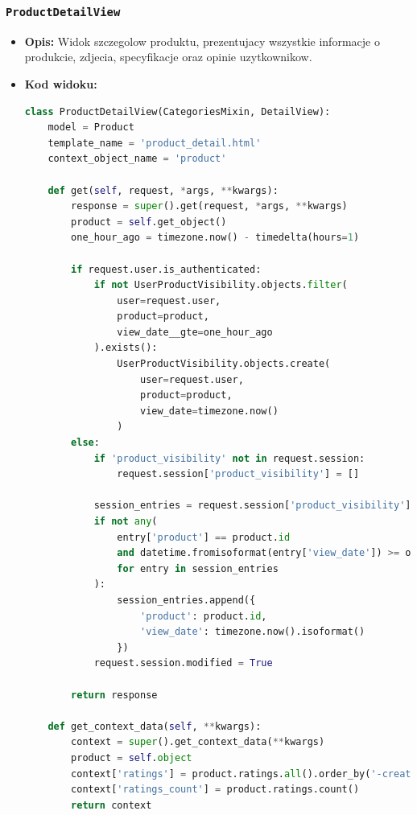 \documentclass[12pt,a4paper,oneside]{article}
\theoremstyle{definition}
\numberwithin{equation}{section}
\begin{document}
\subsubsection*{\texttt{ProductDetailView}}
    \begin{itemize}
        \item \textbf{Opis:} Widok szczegolow produktu, prezentujacy wszystkie informacje o produkcie, zdjecia, specyfikacje oraz opinie uzytkownikow.
        \item \textbf{Kod widoku:}
        \begin{lstlisting}[language=Python, caption=\texttt{ProductDetailView}]
class ProductDetailView(CategoriesMixin, DetailView):
    model = Product
    template_name = 'product_detail.html'
    context_object_name = 'product'

    def get(self, request, *args, **kwargs):
        response = super().get(request, *args, **kwargs)
        product = self.get_object()
        one_hour_ago = timezone.now() - timedelta(hours=1)

        if request.user.is_authenticated:
            if not UserProductVisibility.objects.filter(
                user=request.user,
                product=product,
                view_date__gte=one_hour_ago
            ).exists():
                UserProductVisibility.objects.create(
                    user=request.user, 
                    product=product, 
                    view_date=timezone.now()
                )
        else:
            if 'product_visibility' not in request.session:
                request.session['product_visibility'] = []

            session_entries = request.session['product_visibility']
            if not any(
                entry['product'] == product.id 
                and datetime.fromisoformat(entry['view_date']) >= one_hour_ago
                for entry in session_entries
            ):
                session_entries.append({
                    'product': product.id,
                    'view_date': timezone.now().isoformat()
                })
            request.session.modified = True

        return response

    def get_context_data(self, **kwargs):
        context = super().get_context_data(**kwargs)
        product = self.object
        context['ratings'] = product.ratings.all().order_by('-created_at')
        context['ratings_count'] = product.ratings.count()
        return context
        \end{lstlisting}


\end{itemize}
\end{document}
